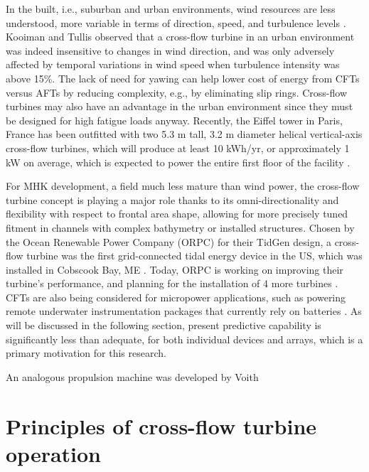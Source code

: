 In the built, i.e., suburban and urban environments, wind resources are less
understood, more variable in terms of direction, speed, and turbulence levels
\cite{Smith2012}. Kooiman and Tullis \cite{Kooiman2010} observed that a
cross-flow turbine in an urban environment was indeed insensitive to changes in
wind direction, and was only adversely affected by temporal variations in wind
speed when turbulence intensity was above 15\%. The lack of need for yawing can
help lower cost of energy from CFTs versus AFTs by reducing complexity, e.g., by
eliminating slip rings. Cross-flow turbines may also have an advantage in the
urban environment since they must be designed for high fatigue loads anyway.
Recently, the Eiffel tower in Paris, France has been outfitted with two 5.3 m
tall, 3.2 m diameter helical vertical-axis cross-flow turbines, which will
produce at least 10 kWh/yr, or approximately 1 kW on average, which is expected
to power the entire first floor of the facility \cite{Lott2015}.

For MHK development, a field much less mature than wind power, the cross-flow
turbine concept is playing a major role thanks to its omni-directionality and
flexibility with respect to frontal area shape, allowing for more precisely
tuned fitment in channels with complex bathymetry or installed structures.
Chosen by the Ocean Renewable Power Company (ORPC) for their TidGen design, a
cross-flow turbine was the first grid-connected tidal energy device in the US,
which was installed in Cobscook Bay, ME \cite{ORPC2012}. Today, ORPC is working
on improving their turbine's performance, and planning for the installation of 4
more turbines \cite{Nelson2013}. CFTs are also being considered for micropower
applications, such as powering remote underwater instrumentation packages that
currently rely on batteries \cite{Polagye2013b}. As will be discussed in the
following section, present predictive capability is significantly less than
adequate, for both individual devices and arrays, which is a primary motivation
for this research.





An analogous propulsion machine was developed by Voith


\section{Principles of cross-flow turbine operation}

